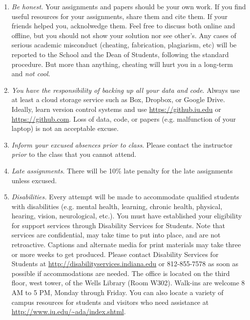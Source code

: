 \documentclass[11pt,article,oneside]{memoir} %
\begin{document}
\begin{enumerate}

\item \emph{Be honest.} Your assignments and papers should be your own work.
If you find useful resources for your assignments, share them and cite them. If
your friends helped you, acknolwedge them. Feel free to discuss both online and
offline, but you should not show your solution nor see other's. Any cases of
serious academic misconduct (cheating, fabrication, plagiarism, etc) will be
reported to the School and the Dean of Students, following the standard
procedure. But more than anything, cheating will hurt you in a long-term and
\emph{not cool}.

\item \emph{You have the responsibility of backing up all your data and code}.
Always use at least a cloud storage service such as Box, Dropbox, or Google
Drive. Ideally, learn version control systems and use
\url{https://github.iu.edu} or \url{https://github.com}. Loss of data, code, or
papers (e.g. malfunction of your laptop) is not an acceptable excuse.

\item \emph{Inform your excused absences prior to class}. Please contact the instructor \emph{prior} to the class that you cannot attend. 

\item \emph{Late assignments}. There will be 10\% late penalty for the late assignments unless excused. 

\item \emph{Disabilities.} Every attempt will be made to accommodate qualified
students with disabilities (e.g. mental health, learning, chronic health,
physical, hearing, vision, neurological, etc.). You must have established your
eligibility for support services through Disability Services for Students. Note
that services are confidential, may take time to put into place, and are not
retroactive.  Captions and alternate media for print materials may take three
or more weeks to get produced. Please contact Disability Services for Students
at \url{http://disabilityservices.indiana.edu} or 812-855-7578 as soon as
possible if accommodations are needed. The office is located on the third
floor, west tower, of the Wells Library (Room W302). Walk-ins are welcome 8 AM
to 5 PM, Monday through Friday. You can also locate a variety of campus
resources for students and visitors who need assistance at
\url{http://www.iu.edu/~ada/index.shtml}.


\end{enumerate}
\end{document}
